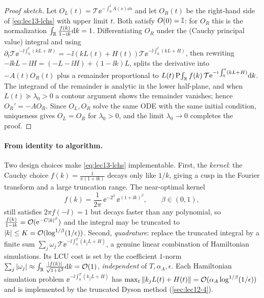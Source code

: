 \begin{proof}[Proof sketch]
Let $O_L(t)=\mathcal T\ee^{-\int_0^t A(s)\dd s}$ and let $O_R(t)$ be the right-hand side of
\eqref{eq:lec13-lchs} with upper limit $t$. Both satisfy $O(0)=\mathbb{I}$: for $O_R$ this is the
normalization $\int_{\mathbb{R}}\frac{f(k)}{1-\mathrm{i} k}\mathrm{d} k=1$. Differentiating $O_R$ under the (Cauchy
principal value) integral and using $\partial_t\mathcal T\ee^{-\ii\int_0^t(kL+H)}=-\ii(kL(t)+
H(t))\mathcal T\ee^{-\ii\int_0^t(kL+H)}$, then rewriting $-\ii kL-\ii H=(-L-\ii H)+(1-\ii k)L$,
splits the derivative into $-A(t)O_R(t)$ plus a remainder proportional to $L(t)\,\mathrm{P}
\!\int_{\mathbb{R}} f(k)\,\mathcal T\mathrm{e}^{-\mathrm{i}\int_0^t(kL+H)}\mathrm{d} k$. The integrand of the remainder is
analytic in the lower half-plane, and when $L(t)\succeq\lambda_0>0$ a contour argument shows the
remainder vanishes; hence $O_R'=-A O_R$. Since $O_L,O_R$ solve the same ODE with the same
initial condition, uniqueness gives $O_L=O_R$ for $\lambda_0>0$, and the limit $\lambda_0\to0$
completes the proof.
\end{proof}

\paragraph{From identity to algorithm.}
Two design choices make \eqref{eq:lec13-lchs} implementable. First, the \emph{kernel}: the
Cauchy choice $f(k)=\frac1{\pi(1+\ii k)}$ decays only like $1/k$, giving a cusp in the Fourier
transform and a large truncation range. The near-optimal kernel
\begin{equation}
  f(k)=\frac{1}{2\pi}\,\ee^{-2^\beta}\,\ee^{(1+\ii k)^\beta},\qquad\beta\in(0,1),
  \label{eq:lec13-kernel}
\end{equation}
still satisfies $2\pi f(-\ii)=1$ but decays faster than any polynomial, so $\frac{f(k)}{1-\mathrm{i} k}
=\mathcal{O}(\mathrm{e}^{-C\left\lvert k \right\rvert^\beta})$ and the integral may be truncated to $\left\lvert k \right\rvert\le K=\mathcal{O}(\log^{1/\beta}
(1/\epsilon))$. Second, \emph{quadrature}: replace the truncated integral by a finite sum
$\sum_j\omega_j\,\mathcal T\ee^{-\ii\int_0^T(k_j L+H)}$, a genuine linear combination of
Hamiltonian simulations. Its LCU cost is set by the coefficient $1$-norm $\sum_j\left\lvert \omega_j \right\rvert
\approx\int_{\mathbb{R}}\frac{\left\lvert f(k) \right\rvert}{\sqrt{1+k^2}}\mathrm{d} k=\mathcal{O}(1)$, \emph{independent} of $T,\alpha_A,
\epsilon$. Each Hamiltonian simulation problem $\ee^{-\ii\int_0^T(k_j L+H)}$ has
$\max_t\left\lVert k_jL(t)+H(t) \right\rVert=\mathcal{O}(\alpha_A\log^{1/\beta}(1/\epsilon))$ and is implemented by the
truncated Dyson method (\cref{sec:lec12-4}).

